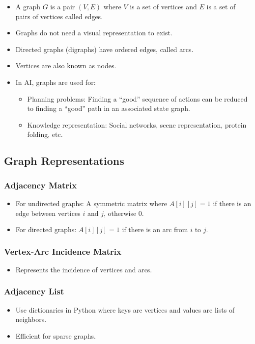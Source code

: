 \documentclass[8pt]{article}
\begin{document}
\begin{itemize}
    \item A graph \( G \) is a pair \( (V, E) \) where \( V \) is a set of vertices and \( E \) is a set of pairs of vertices called edges.
    \item Graphs do not need a visual representation to exist.
    \item Directed graphs (digraphs) have ordered edges, called arcs.
    \item Vertices are also known as nodes.
    \item In AI, graphs are used for:
    \begin{itemize}
        \item Planning problems: Finding a “good” sequence of actions can be reduced to finding a “good” path in an associated state graph.
        \item Knowledge representation: Social networks, scene representation, protein folding, etc.
    \end{itemize}
\end{itemize}

\subsection{Graph Representations}
\subsubsection{Adjacency Matrix}
\begin{itemize}
    \item For undirected graphs: A symmetric matrix where \( A[i][j] = 1 \) if there is an edge between vertices \( i \) and \( j \), otherwise \( 0 \).
    \item For directed graphs: \( A[i][j] = 1 \) if there is an arc from \( i \) to \( j \).
\end{itemize}

\subsubsection{Vertex-Arc Incidence Matrix}
\begin{itemize}
    \item Represents the incidence of vertices and arcs.
\end{itemize}

\subsubsection{Adjacency List}
\begin{itemize}
    \item Use dictionaries in Python where keys are vertices and values are lists of neighbors.
    \item Efficient for sparse graphs.
\end{itemize}
\end{document}
